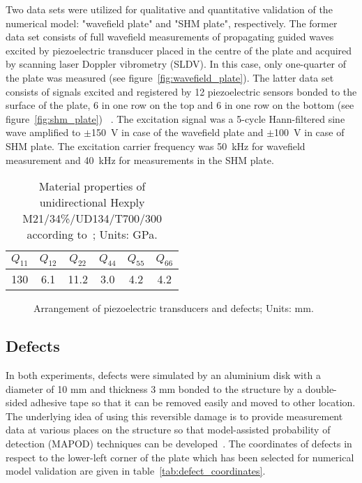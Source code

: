 \documentclass[12pt]{iopart}
\begin{document}
Two data sets were utilized for qualitative and quantitative validation of the numerical model: "wavefield plate" and "SHM plate", respectively. The former data set consists of full wavefield measurements of propagating guided waves excited by piezoelectric transducer placed in the centre of the plate and acquired by scanning laser Doppler vibrometry (SLDV). In this case, only one-quarter of the plate was measured (see figure~\ref{fig:wavefield_plate}). The latter data set consists of signals excited and registered by 12 piezoelectric sensors bonded to the surface of the plate, 6 in one row on the top and 6 in one row on the bottom (see figure~\ref{fig:shm_plate})~ \cite{Moll2018}. The excitation signal was a 5-cycle Hann-filtered sine wave amplified to \(\pm\)150~V in case of the wavefield plate and  \(\pm\)100~V in case of SHM plate. The excitation carrier frequency was 50~kHz for wavefield measurement and 40~kHz for measurements in the SHM plate.
\begin{table}
	\caption{Material properties of unidirectional Hexply M21/34\%/UD134/T700/300 according to~\cite{Moll2018}; Units: GPa.}
	\begin{indented}
	\item[]	\begin{tabular}{cccccc} 
		\toprule
		\(Q_{11}\) & \(Q_{12}\)  & \(Q_{22}\) & \(Q_{44}\) & \(Q_{55}\) & \(Q_{66}\)\\
		\midrule
		130& 6.1& 11.2 & 3.0 & 4.2 & 4.2\\
		\bottomrule 
	\end{tabular} 
	\label{tab:mat_prop}
	\end{indented}
\end{table}

\begin{figure} [h!]
	\centering
		\hspace{5mm}
	\caption{Arrangement of piezoelectric transducers and defects; Units: mm.}
	\label{fig:plate_arrangement}
\end{figure}

\subsection{Defects}
In both experiments, defects were simulated by an aluminium disk with a diameter of 10 mm and thickness 3 mm bonded to the structure by a double-sided adhesive tape so that it can be removed easily and moved to other location. The underlying idea of using this reversible damage is to provide measurement data at various places on the structure so that model-assisted probability of detection (MAPOD) techniques can be developed~\cite{Eckstein2012}. The coordinates of defects in respect to the lower-left corner of the plate which has been selected for numerical model validation are given in table~\ref{tab:defect_coordinates}.
\end{document}
